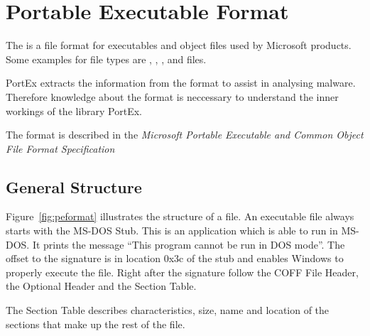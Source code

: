 \chapter{Portable Executable Format} \label{chap:peformat}

The \PE{} is a file format for executables and object files used by Microsoft products. Some examples for \PE{} file types are \DLL{}, \FON{}, \DRV{}, \SYS{} and \EXE{} files.

PortEx extracts the information from the \PE{} format to assist in analysing malware. Therefore knowledge about the \PE{} format is neccessary to understand the inner workings of the library PortEx.

The \PE{} format is described in the \emph{Microsoft Portable Executable and Common Object File Format Specification} \cite{pespec}

\section{General Structure}

Figure~\ref{fig:peformat} illustrates the structure of a \PE{} file. An executable \PE{} file always starts with the MS-DOS Stub. This is an application which is able to run in MS-DOS. It prints the message \enquote{This program cannot be run in DOS mode}. The offset to the \PE{} signature is in location 0x3c of the stub and enables Windows to properly execute the \PE{} file. Right after the signature follow the COFF File Header, the Optional Header and the Section Table.

The Section Table describes \ia{} characteristics, size, name and location of the sections that make up the rest of the \PE{} file.


